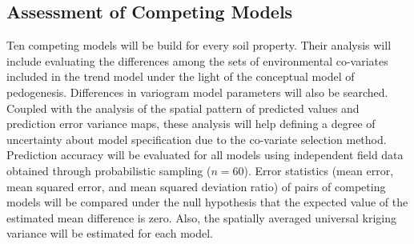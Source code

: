 \subsection{Assessment of Competing Models}

Ten competing models will be build for every soil property. Their analysis will include evaluating the differences among the sets of environmental co-variates included in the trend model under the light of the conceptual model of pedogenesis. Differences in variogram model parameters will also be searched. Coupled with the analysis of the spatial pattern of predicted values and prediction error variance maps, these analysis will help defining a degree of uncertainty about model specification due to the co-variate selection method. Prediction accuracy will be evaluated for all models using independent field data obtained through probabilistic sampling ($n=60$). Error statistics (mean error, mean squared error, and mean squared deviation ratio) of pairs of competing models will be compared under the null hypothesis that the expected value of the estimated mean difference is zero. Also, the spatially averaged universal kriging variance will be estimated for each model.
